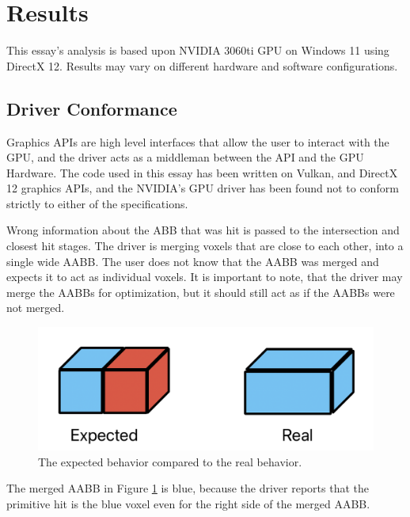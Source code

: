 \documentclass[12pt]{article}
\begin{document}
\section{Results}

This essay's analysis is based upon NVIDIA 3060ti GPU on Windows 11 using DirectX 12.
Results may vary on different hardware and software configurations.

\subsection{Driver Conformance}

Graphics APIs are high level interfaces that allow the user to interact with the GPU,
and the driver acts as a middleman between the API and the GPU Hardware.
The code used in this essay has been written on Vulkan, and DirectX 12 graphics APIs,
and the NVIDIA's GPU driver has been found not to conform strictly to either of the specifications.

Wrong information about the ABB that was hit is passed to the intersection and closest hit stages.
The driver is merging voxels that are close to each other, into a single wide AABB.
The user does not know that the AABB was merged and expects it to act as individual voxels.
It is important to note, that the driver may merge the AABBs for optimization, but it should still act as if the AABBs were not merged.

\begin{figure}[H]
    \begin{center}
        \includegraphics[scale=0.5]{Voxel-Merging}
    \end{center}
    \caption{
        The expected behavior compared to the real behavior.
        }
        \label{fig:Voxel-Merging}
    \end{figure}
    
The merged AABB in Figure \ref{fig:Voxel-Merging} is blue,
because the driver reports that the primitive hit is the blue voxel even for the right side of the merged AABB.
\end{document}
